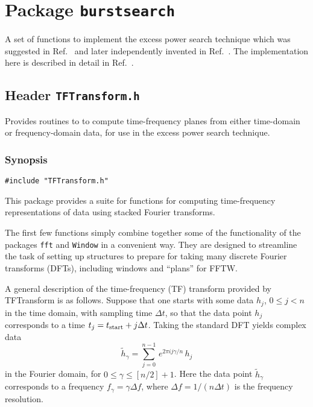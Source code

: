 \chapter{Package \texttt{burstsearch}}

A set of functions to implement the excess power search technique which was
suggested in Ref.~\cite{fh:1998} and later independently invented in
Ref.~\cite{acdhp:1999}.  The implementation here is described in detail in
Ref.~\cite{abcf:2000}. 

\newpage
\section{Header \texttt{TFTransform.h}}
\label{s:TFTransform.h}

\noindent Provides routines to to compute time-frequency planes from either
time-domain or frequency-domain data, for use in the excess
power search technique.

\subsection*{Synopsis}
\begin{verbatim}
#include "TFTransform.h"
\end{verbatim}

\noindent This package provides a suite for functions for computing time-frequency
representations of data using stacked Fourier transforms.

The first few functions simply combine together some of the functionality of
the packages \verb+fft+ and \verb+Window+ in a convenient way.  They are
designed to streamline the task of setting up structures to prepare for taking
many discrete Fourier transforms (DFTs), including windows and ``plans'' for
FFTW.

A general description of the time-frequency (TF) transform provided by
TFTransform is as follows.  Suppose that one starts with some data $h_j$, $0
\le j < n$ in the time domain, with sampling time $\Delta t$, so that the data
point $h_j$ corresponds to a time $t_j = t_{\rm start} + j \Delta t$.  Taking
the standard DFT yields complex data
\begin{equation}
{\tilde h}_\gamma = \sum_{j=0}^{n-1} \, e^{2 \pi i j \gamma / n} \, h_j
\label{standarddft}
\end{equation}
in the Fourier domain, for $0 \le \gamma \le [n/2]+1$.  Here the data point
${\tilde h}_\gamma$ corresponds to a frequency $f_\gamma = \gamma \Delta f$,
where $\Delta f= 1/(n \Delta t)$ is the frequency resolution.  


